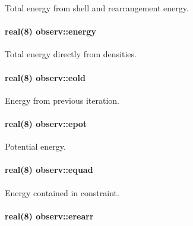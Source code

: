 Total energy from shell and rearrangement energy. 

\paragraph[{\texorpdfstring{energy}{energy}}]{\setlength{\rightskip}{0pt plus 5cm}real(8) observ\+::energy}\hypertarget{namespaceobserv_a49a7e3ba548450307b3a2c22ace8b3f3}{}\label{namespaceobserv_a49a7e3ba548450307b3a2c22ace8b3f3}


Total energy directly from densities. 

\paragraph[{\texorpdfstring{eold}{eold}}]{\setlength{\rightskip}{0pt plus 5cm}real(8) observ\+::eold}\hypertarget{namespaceobserv_a1988e691b9c7e5f98cb2e13a4a229908}{}\label{namespaceobserv_a1988e691b9c7e5f98cb2e13a4a229908}


Energy from previous iteration. 

\paragraph[{\texorpdfstring{epot}{epot}}]{\setlength{\rightskip}{0pt plus 5cm}real(8) observ\+::epot}\hypertarget{namespaceobserv_a87e633bdcc50c87ba74f4f69c97c8534}{}\label{namespaceobserv_a87e633bdcc50c87ba74f4f69c97c8534}


Potential energy. 

\paragraph[{\texorpdfstring{equad}{equad}}]{\setlength{\rightskip}{0pt plus 5cm}real(8) observ\+::equad}\hypertarget{namespaceobserv_ab70baa891e5608be4ea8c1a24c762d12}{}\label{namespaceobserv_ab70baa891e5608be4ea8c1a24c762d12}


Energy contained in constraint. 

\paragraph[{\texorpdfstring{erearr}{erearr}}]{\setlength{\rightskip}{0pt plus 5cm}real(8) observ\+::erearr}\hypertarget{namespaceobserv_aadc4a7afed808cde5967554c7cf067d6}{}\label{namespaceobserv_aadc4a7afed808cde5967554c7cf067d6}


